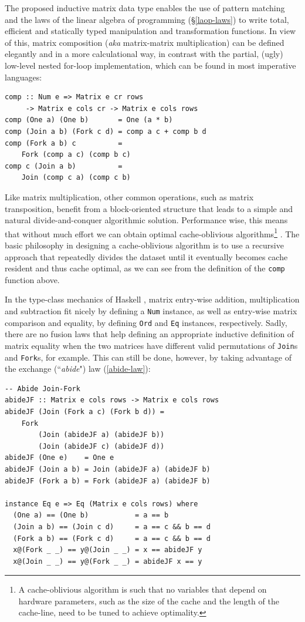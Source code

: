 \documentclass[sigplan,screen]{acmart}\settopmatter{}
\newcommand{\hs}{\texttt}
\begin{document}
The proposed inductive matrix data type enables the use of pattern matching and the laws of the linear algebra of programming (\S\ref{laop-laws}) to write total, efficient and statically typed manipulation and transformation functions. In view of this, matrix composition (\emph{aka} matrix-matrix multiplication) can be defined elegantly and in a more calculational way, in contrast with the partial, (ugly) low-level nested for-loop implementation, which can be found in most imperative languages:
\begin{verbatim}
comp :: Num e => Matrix e cr rows 
     -> Matrix e cols cr -> Matrix e cols rows
comp (One a) (One b)       = One (a * b)
comp (Join a b) (Fork c d) = comp a c + comp b d
comp (Fork a b) c          = 
    Fork (comp a c) (comp b c)
comp c (Join a b)          = 
    Join (comp c a) (comp c b)
\end{verbatim}
Like matrix multiplication, other common operations, such as matrix transposition, benefit from a block-oriented structure that leads to a simple and natural divide-and-conquer algorithmic solution. Performance wise, this means that without much effort we can obtain optimal cache-oblivious algorithms\footnote{A cache-oblivious algorithm is such that no variables that depend on hardware parameters, such as the size of the cache and the length of the cache-line, need to be tuned to achieve optimality.} \citep{frigo1999cache}. The basic philosophy in designing a cache-oblivious algorithm is to use a recursive approach that repeatedly divides the dataset until it eventually becomes cache resident and thus cache optimal, as we can see from the definition of the \hs{comp} function above.

In the type-class mechanics of Haskell \cite{hall1996type}, matrix entry-wise addition, multiplication and subtraction fit nicely by defining a \hs{Num} instance, as well as entry-wise matrix comparison and equality, by defining \hs{Ord} and \hs{Eq} instances, respectively. Sadly, there are no fusion laws that help defining an appropriate inductive definition of matrix equality when the two matrices have different valid permutations of \hs{Join}s and \hs{Fork}s, for example. This can still be done, however, by taking advantage of the exchange (``\emph{abide}") law (\ref{abide-law}):

\vspace{1mm}
\begin{verbatim}
-- Abide Join-Fork
abideJF :: Matrix e cols rows -> Matrix e cols rows
abideJF (Join (Fork a c) (Fork b d)) = 
    Fork 
        (Join (abideJF a) (abideJF b)) 
        (Join (abideJF c) (abideJF d))
abideJF (One e)    = One e
abideJF (Join a b) = Join (abideJF a) (abideJF b)
abideJF (Fork a b) = Fork (abideJF a) (abideJF b)

instance Eq e => Eq (Matrix e cols rows) where
  (One a) == (One b)           = a == b
  (Join a b) == (Join c d)     = a == c && b == d
  (Fork a b) == (Fork c d)     = a == c && b == d
  x@(Fork _ _) == y@(Join _ _) = x == abideJF y
  x@(Join _ _) == y@(Fork _ _) = abideJF x == y
\end{verbatim}
\vspace{1mm}
\end{document}
